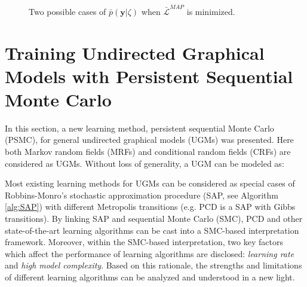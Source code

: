 \begin{figure}[t]
    \centering
    \caption{Two possible cases of $\bar{p}(\mathbf{y}|\zeta)$ when $\bar{\mathcal{L}}^{MAP}$ is minimized.  } 
    \label{fig:MAP_outputs}
\end{figure}


\section{Training Undirected Graphical Models with Persistent Sequential Monte Carlo}
In this section, a new learning method, persistent sequential Monte Carlo (PSMC), for general undirected graphical
models (UGMs) was presented.
Here both Markov random fields (MRFs) and conditional random fields (CRFs) are considered as UGMs.
Without loss of generality, a UGM can be modeled as:
 
Most existing learning methods for
UGMs can be considered as special cases of Robbins-Monro’s stochastic approximation procedure (SAP, see Algorithm \ref{alg:SAP}) 
with different Metropolis transitions (e.g. PCD is a SAP with Gibbs transitions). By linking SAP
and sequential Monte Carlo (SMC), PCD and other state-of-the-art learning algorithms can be cast into a
SMC-based interpretation framework. Moreover, within the SMC-based interpretation, two key factors
which affect the performance of learning algorithms are disclosed: \emph{learning rate} and \emph{high model complexity}.
Based on this rationale, the strengths and limitations of different learning algorithms can be analyzed
and understood in a new light.

